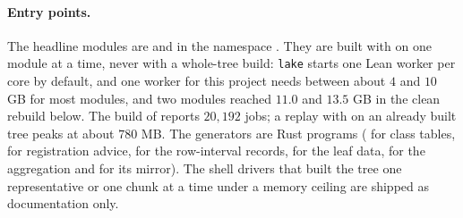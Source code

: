 \documentclass[11pt]{article}
\theoremstyle{remark}
\begin{document}
\paragraph{Entry points.} The headline modules are  and  in the namespace . They are built with  on one module at a time, never with a whole-tree build: \texttt{lake} starts one Lean worker per core by default, and one worker for this project needs between about $4$ and $10$ GB for most modules, and two modules reached $11.0$ and $13.5$ GB in the clean rebuild below. The build of  reports $20{,}192$ jobs; a replay with  on an already built tree peaks at about $780$ MB. The generators are Rust programs ( for class tables,  for registration advice,  for the row-interval records,  for the leaf data,  for the aggregation and  for its mirror). The shell drivers that built the tree one representative or one chunk at a time under a memory ceiling are shipped as documentation only.
\end{document}
